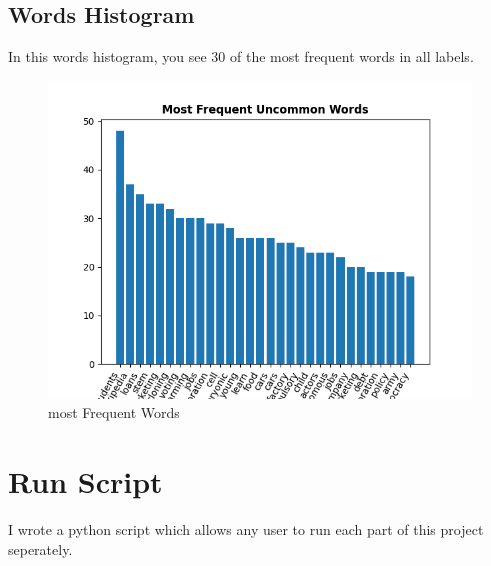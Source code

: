 \subsection{Words Histogram}
In this words histogram, you see 30 of the most frequent words in all labels.
\begin{figure}[H]
    \begin{center}
        \includegraphics[width=\linewidth]{../stats/words_histogram.png}
        \caption{most Frequent Words}
    \end{center}
\end{figure}

\section{Run Script}
I wrote a python script which allows any user to run each part of this project seperately.
